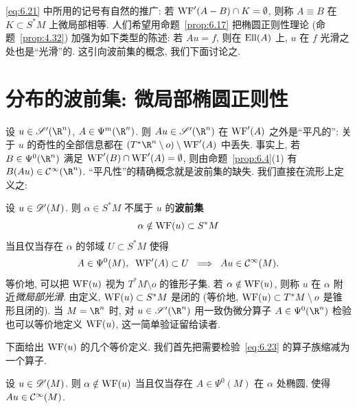 \eqref{eq:6.21} 中所用的记号有自然的推广: 若 $\operatorname{WF}'(A - B) \cap K = \emptyset$, 则称 $A \equiv B$ 在 $K \subset S^* M$ 上微局部相等. 人们希望用命题~\ref{prop:6.17} 把椭圆正则性理论 (命题~\ref{prop:4.32}) 加强为如下类型的陈述: 若 $A u = f$, 则在 $\operatorname{Ell}(A)$ 上, $u$ 在 $f$ 光滑之处也是``光滑''的. 这引向波前集的概念, 我们下面讨论之.



\section{分布的波前集: 微局部椭圆正则性}\label{sec:6.3}
%
%

设 $u \in \mathscr{S}'(\R^n)$, $A \in \Psi^m(\R^n)$. 则 $A u \in \mathscr{S}'(\R^n)$ 在 $\operatorname{WF}'(A)$ 之外是``平凡的'': 关于 $u$ 的奇性的全部信息都在 $(T^* \R^n \setminus o) \setminus \WF'(A)$ 中丢失. 事实上, 若 $B \in \Psi^0(\R^n)$ 满足 $\operatorname{WF}'(B) \cap \operatorname{WF}'(A) = \emptyset$, 则由命题~\ref{prop:6.4}(1) 有 $B(A u) \in \Smooth(\R^n)$. ``平凡性''的精确概念就是波前集的缺失. 我们直接在流形上定义之:

\begin{definition}[波前集]\label{def:6.18}
设 $u \in \mathscr{D}'(M)$. 则 $\alpha \in S^* M$ 不属于 $u$ 的\textbf{波前集}
\begin{equation}\label{eq:6.22}
    \alpha \notin \operatorname{WF}(u) \subset S^* M
\end{equation}
当且仅当存在 $\alpha$ 的邻域 $U \subset S^* M$ 使得
\begin{equation}\label{eq:6.23}
    A \in \Psi^0(M), \;\; \operatorname{WF}'(A) \subset U \;\; \Longrightarrow \;\; A u \in \mathcal{C}^\infty(M).
\end{equation}
等价地, 可以把 $\operatorname{WF}(u)$ 视为 $T^* M \setminus o$ 的锥形子集. 若 $\alpha \notin \operatorname{WF}(u)$, 则称 $u$ 在 $\alpha$ 附近\emph{微局部光滑}. 由定义, $\operatorname{WF}(u) \subset S^* M$ 是闭的 (等价地, $\operatorname{WF}(u) \subset T^* M \setminus o$ 是锥形且闭的). 当 $M = \R^n$ 时, 对 $u \in \mathscr{S}'(\R^n)$ 用一致伪微分算子 $A \in \Psi^0(\R^n)$ 检验也可以等价地定义 $\operatorname{WF}(u)$, 这一简单验证留给读者.
\end{definition}

下面给出 $\operatorname{WF}(u)$ 的几个等价定义. 我们首先把需要检验~\eqref{eq:6.23} 的算子族缩减为一个算子.

\begin{lemma}\label{lem:6.19}
设 $u \in \mathscr{D}'(M)$. 则 $\alpha \notin \operatorname{WF}(u)$ 当且仅当存在 $A \in \Psi^0(M)$ 在 $\alpha$ 处椭圆, 使得 $A u \in \mathcal{C}^\infty(M)$.
\end{lemma}

